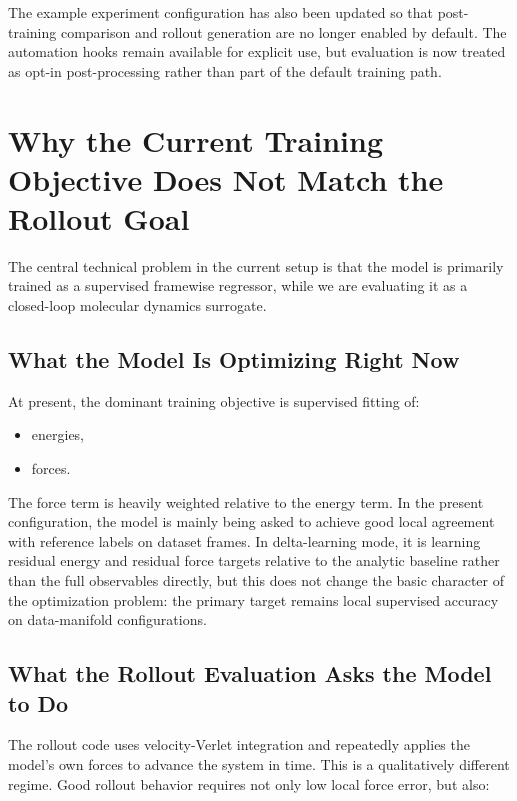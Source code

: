 \documentclass[11pt]{article}
\begin{document}
The example experiment configuration has also been updated so that post-training comparison and rollout generation are no longer enabled by default. The automation hooks remain available for explicit use, but evaluation is now treated as opt-in post-processing rather than part of the default training path.

\section{Why the Current Training Objective Does Not Match the Rollout Goal}

The central technical problem in the current setup is that the model is primarily trained as a supervised framewise regressor, while we are evaluating it as a closed-loop molecular dynamics surrogate.

\subsection{What the Model Is Optimizing Right Now}

At present, the dominant training objective is supervised fitting of:

\begin{itemize}
  \item energies,
  \item forces.
\end{itemize}

The force term is heavily weighted relative to the energy term. In the present configuration, the model is mainly being asked to achieve good local agreement with reference labels on dataset frames. In delta-learning mode, it is learning residual energy and residual force targets relative to the analytic baseline rather than the full observables directly, but this does not change the basic character of the optimization problem: the primary target remains local supervised accuracy on data-manifold configurations.

\subsection{What the Rollout Evaluation Asks the Model to Do}

The rollout code uses velocity-Verlet integration and repeatedly applies the model's own forces to advance the system in time. This is a qualitatively different regime. Good rollout behavior requires not only low local force error, but also:
\end{document}
